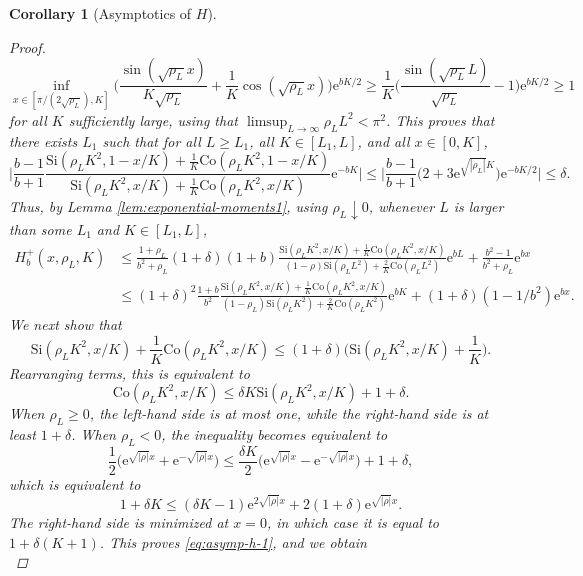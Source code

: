 \documentclass[a4paper, a4wide, 10pt, reqno]{amsart}
\theoremstyle{plain}
\newtheorem{corollary}[theorem]{Corollary}
\theoremstyle{definition}
\numberwithin{equation}{section}
\newcommand{\re}{{\mathrm e}}
\newcommand{\Co}{{\mathrm{Co}}}
\newcommand{\Si}{{\mathrm{Si}}}
\begin{document}
\begin{corollary}[Asymptotics of $H$]
\begin{proof}
        \[
        \inf_{x\in[\pi/(2\sqrt{\rho_L}), K]}\bigg(\frac{\sin(\sqrt{\rho_L}x)}{K\sqrt{\rho_L}} + \frac{1}{K}\cos(\sqrt{\rho_L}x)\bigg)\re^{bK/2} \ge \frac{1}{K}\bigg(\frac{\sin(\sqrt{\rho_L}L)}{\sqrt{\rho_L}} - 1\bigg)\re^{bK/2} \ge 1
        \]
        for all $K$ sufficiently large, using that $\limsup_{L\to\infty} \rho_L L^2<\pi^2$. This proves that there exists $L_1$ such that for all $L\ge L_1$, all $K\in[L_1, L]$, and all $x\in[0, K]$, 
        \[
        \bigg|\frac{b-1}{b+1}\frac{\Si(\rho_L K^2, 1-x/K) + \frac{1}{K}\Co(\rho_LK^2, 1-x/K)}{\Si(\rho_L K^2, x/K) + \frac{1}{K}\Co(\rho_LK^2, x/K)}\re^{-bK}\bigg| \le 
        \bigg|\frac{b-1}{b+1}\big(2+3\re^{\sqrt{|\rho_L|}K}\big)\re^{-bK/2}\bigg|\le \delta.
        \]
        Thus, by Lemma \ref{lem:exponential-moments1}, using $\rho_L\downarrow 0$, whenever $L$ is larger than some $L_1$ and $K\in[L_1, L]$,
        \[
        \begin{aligned}
        H_b^+(x, \rho_L, K) &\le \frac{1+\rho_L}{b^2+\rho_L}(1+\delta)(1+b)\frac{\Si(\rho_L K^2, x/K) + \frac{1}{K}\Co(\rho_L K^2, x/K)}{(1-\rho)\Si(\rho_L L^2) + \frac{2}{K}\Co(\rho_L L^2)}\re^{bL} + \frac{b^2-1}{b^2+\rho_L}\re^{bx}\\
        &\le (1+\delta)^2\frac{1+b}{b^2}\frac{\Si(\rho_L K^2, x/K) + \frac{1}{K}\Co(\rho_L K^2, x/K)}{(1-\rho_L)\Si(\rho_L K^2) + \frac{2}{K}\Co(\rho_L K^2)}\re^{bK} + (1+\delta)(1-1/b^2)\re^{bx}.
        \end{aligned}
        \]
        We next  show that 
        \begin{equation}\label{eq:asymp-h-1}
        \Si(\rho_L K^2, x/K) + \frac{1}{K}\Co(\rho_L K^2, x/K) \le (1+\delta)\Big( \Si(\rho_L K^2, x/K) + \frac{1}{K}\Big).
        \end{equation}
        Rearranging terms, this is equivalent to 
        \[
        \Co(\rho_L K^2, x/K) \le \delta K \Si(\rho_L K^2, x/K) + 1+\delta.
        \]
        When $\rho_L\ge 0$, the left-hand side is at most one, while the right-hand side is at least $1+\delta$. When $\rho_L<0$, the inequality becomes equivalent to 
        \[
        \frac{1}{2}\Big(\re^{\sqrt{|\rho|}x}+\re^{-\sqrt{|\rho|}x}\Big) \le \frac{\delta K}{2}\Big(\re^{\sqrt{|\rho|}x}-\re^{-\sqrt{|\rho|}x}\Big) + 1+\delta,
        \]
        which is equivalent to 
        \[
        1+\delta K\le (\delta K-1)\re^{2\sqrt{|\rho|}x} + 2(1+\delta)\re^{\sqrt{|\rho|}x}.
        \]
        The right-hand side is minimized at $x=0$, in which case it is equal to $1+\delta (K+1)$. This proves \eqref{eq:asymp-h-1}, and we obtain 
        \[
\]
\end{proof}
\end{corollary}
\end{document}
